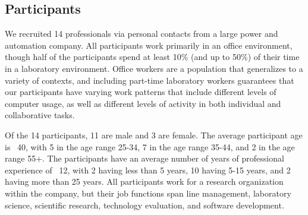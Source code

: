 \subsection{Participants}
We recruited 14 professionals via personal contacts from a large power and automation company. All participants work primarily in an office environment, though half of the participants spend at least 10\% (and up to 50\%) of their time in a laboratory environment. Office workers are a population that generalizes to a variety of contexts, and including part-time laboratory workers guarantees that our participants have varying work patterns that include different levels of computer usage, as well as different levels of activity in both individual and collaborative tasks.

Of the 14 participants, 11 are male and 3 are female. The average participant age is ~40, with 5 in the age range 25-34, 7 in the age range 35-44, and 2 in the age range 55+. The participants have an average number of years of professional experience of ~12, with 2 having less than 5 years, 10 having 5-15 years, and 2 having more than 25 years. All participants work for a research organization within the company, but their job functions span line management, laboratory science, scientific research, technology evaluation, and software development.

